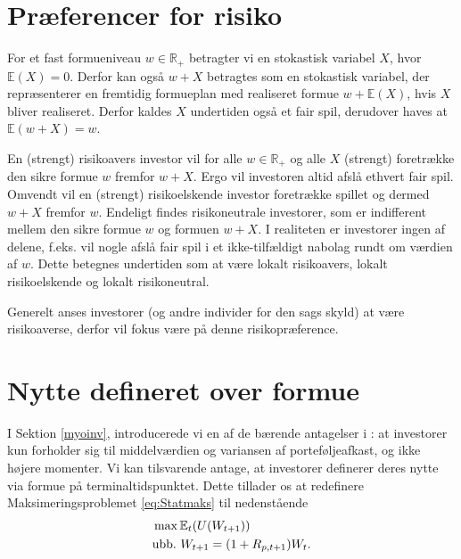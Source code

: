 \documentclass[
  a4paper,
  oneside]{memoir}
\begin{document}
\hypertarget{pruxe6ferencer-for-risiko}{%
\section{Præferencer for risiko}\label{pruxe6ferencer-for-risiko}}

For et fast formueniveau \(w\in \mathbb{R}_+\) betragter vi en stokastisk variabel \(X\), hvor \(\mathbb{E}(X)=0\). Derfor kan også \(w+X\) betragtes som en stokastisk variabel, der repræsenterer en fremtidig formueplan med realiseret formue \(w+\mathbb{E}(X)\), hvis \(X\) bliver realiseret. Derfor kaldes \(X\) undertiden også et fair spil, derudover haves at \(\mathbb{E}(w+X)=w\).

En (strengt) risikoavers investor vil for alle \(w\in \mathbb{R}_+\) og alle \(X\) (strengt) foretrække den sikre formue \(w\) fremfor \(w+X\). Ergo vil investoren altid afslå ethvert fair spil. Omvendt vil en (strengt) risikoelskende investor foretrække spillet og dermed \(w+X\) fremfor \(w\). Endeligt findes risikoneutrale investorer, som er indifferent mellem den sikre formue \(w\) og formuen \(w+X\). I realiteten er investorer ingen af delene, f.eks. vil nogle afslå fair spil i et ikke-tilfældigt nabolag rundt om værdien af \(w\). Dette betegnes undertiden som at være lokalt risikoavers, lokalt risikoelskende og lokalt risikoneutral.

Generelt anses investorer (og andre individer for den sags skyld) at være risikoaverse, derfor vil fokus være på denne risikopræference.

\hypertarget{nytte-defineret-over-formue}{%
\section{Nytte defineret over formue}\label{nytte-defineret-over-formue}}

I Sektion \ref{myoinv}, introducerede vi en af de bærende antagelser i \citep{Markowitz1952}: at investorer kun forholder sig til middelværdien og variansen af porteføljeafkast, og ikke højere momenter. Vi kan tilsvarende antage, at investorer definerer deres nytte via formue på terminaltidspunktet. Dette tillader os at redefinere Maksimeringsproblemet \eqref{eq:Statmaks} til nedenstående
\begin{align}
&\max\mathbb {E}_t(U(W_{t+1})) \label{eq:Nyttemaks}\\
&\text{ubb.}\,\,W_{t+1}=(1+R_{p,t+1})W_t.\notag
\end{align}
\end{document}
